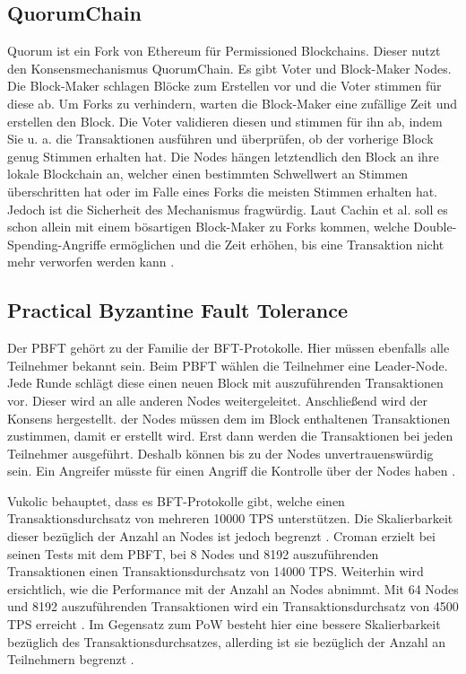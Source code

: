 \subsection{QuorumChain}
Quorum ist ein Fork von Ethereum für Permissioned Blockchains. Dieser nutzt den Konsensmechanismus QuorumChain. Es gibt Voter und Block-Maker Nodes. Die Block-Maker schlagen Blöcke zum Erstellen vor und die Voter stimmen für diese ab. Um Forks zu verhindern, warten die Block-Maker eine zufällige Zeit und erstellen den Block. Die Voter validieren diesen und stimmen für ihn ab, indem Sie u. a. die Transaktionen ausführen und überprüfen, ob der vorherige Block genug Stimmen erhalten hat. Die Nodes hängen letztendlich den Block an ihre lokale Blockchain an, welcher einen bestimmten Schwellwert an Stimmen überschritten hat oder im Falle eines Forks die meisten Stimmen erhalten hat. Jedoch ist die Sicherheit des Mechanismus fragwürdig. Laut Cachin et al. soll es schon allein mit einem bösartigen Block-Maker zu Forks kommen, welche Double-Spending-Angriffe ermöglichen und die Zeit erhöhen, bis eine Transaktion nicht mehr verworfen werden kann \cite{CachinBlockchainConsensusProtocols2017}.

\subsection{Practical Byzantine Fault Tolerance}
Der \acs{PBFT} gehört zu der Familie der \acs{BFT}-Protokolle. Hier müssen ebenfalls alle Teilnehmer bekannt sein. Beim \acs{PBFT} wählen die Teilnehmer eine Leader-Node. Jede Runde schlägt diese einen neuen Block mit auszuführenden Transaktionen vor. Dieser wird an alle anderen Nodes weitergeleitet. Anschließend wird der Konsens hergestellt.  der Nodes müssen dem im Block enthaltenen Transaktionen zustimmen, damit er erstellt wird. Erst dann werden die Transaktionen bei jeden Teilnehmer ausgeführt. Deshalb können bis zu  der Nodes unvertrauenswürdig sein. Ein Angreifer müsste für einen Angriff die Kontrolle über  der Nodes haben \cite{SukhwaniPerformanceModelingPBFT2017a}\cite{ZhengBlockchainChallengesOpportunities2017}. 

Vukolic behauptet, dass es \acs{BFT}-Protokolle gibt, welche einen Transaktionsdurchsatz von mehreren 10000 \acs{TPS} unterstützen. Die Skalierbarkeit dieser bezüglich der Anzahl an Nodes ist jedoch begrenzt \cite{Vukolicquestscalableblockchain2015}. Croman erzielt bei seinen Tests mit dem PBFT, bei 8 Nodes und 8192 auszuführenden Transaktionen einen Transaktionsdurchsatz von 14000 \acs{TPS}. Weiterhin wird ersichtlich, wie die Performance mit der Anzahl an Nodes abnimmt. Mit 64 Nodes und 8192 auszuführenden Transaktionen wird ein Transaktionsdurchsatz von 4500 \acs{TPS} erreicht \cite{CromanScalingDecentralizedBlockchains2016}. Im Gegensatz zum \acs{PoW} besteht hier eine bessere Skalierbarkeit bezüglich des Transaktionsdurchsatzes, allerding ist sie bezüglich der Anzahl an Teilnehmern begrenzt \cite{Vukolicquestscalableblockchain2015}.

